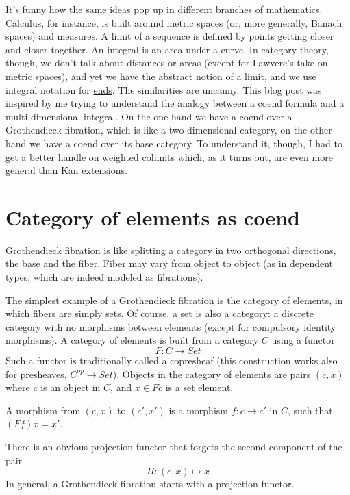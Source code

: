 \documentclass[11pt]{amsart}
\begin{document}
It's funny how the same ideas pop up in different branches of mathematics. Calculus, for instance, is built around metric spaces (or, more generally, Banach spaces) and measures. A limit of a sequence is defined by points getting closer and closer together. An integral is an area under a curve. In category theory, though, we don't talk about distances or areas (except for Lawvere's take on metric spaces), and yet we have the abstract notion of a \href{https://bartoszmilewski.com/2015/04/15/limits-and-colimits/}{limit}, and we use integral notation for \href{https://bartoszmilewski.com/2017/03/29/ends-and-coends/}{ends}. The similarities are uncanny. This blog post was inspired by me trying to understand the analogy between a coend formula and a multi-dimensional integral. On the one hand we have a coend over a Grothendieck fibration, which is like a two-dimensional category, on the other hand we have a coend over its base category. To understand it, though, I had to get a better handle on weighted colimits which, as it turns out, are even more general than Kan extensions. 

\section{Category of elements as coend}

\href{https://bartoszmilewski.com/2019/10/09/fibrations-cleavages-and-lenses/}{Grothendieck fibration} is like splitting a category in two orthogonal directions, the base and the fiber. Fiber may vary from object to object (as in dependent types, which are indeed modeled as fibrations). 

The simplest example of a Grothendieck fibration is the category of elements, in which fibers are simply sets. Of course, a set is also a category: a discrete category with no morphisms between elements (except for compulsory identity morphisms). A category of elements is built from a category $C$ using a functor
\[F \colon C \to Set\]
Such a functor is traditionally called a copresheaf (this construction works also for presheaves, $C^{op} \to Set$). Objects in the category of elements are pairs $(c, x)$ where $c$ is an object in $C$, and $x \in F c$ is a set element. 

A morphism from $(c, x)$ to $(c', x')$ is a morphism  $f \colon c \to c'$ in $C$, such that $(F f) x = x'$.

There is an obvious projection functor that forgets the second component of the pair
\[\Pi \colon (c, x) \mapsto x\]
In general, a Grothendieck fibration starts with a projection functor.
\end{document}
